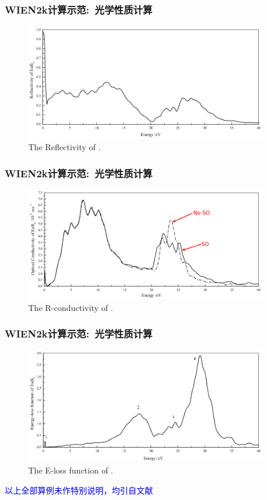 \documentclass[cjk,slidestop,compress,mathserif,blue]{beamer}
\begin{document}
\frame
{
	\frametitle{\textrm{WIEN2k}计算示范:~光学性质计算}
\vspace*{-5pt}
\begin{figure}[h!]
\centering
\includegraphics[width=4.15in]{Figures/WIEN2k_EuB6-Reflect.png}
\caption{\tiny \textrm{The Reflectivity of .}}%
\label{Fig:WIEN2k_EuB6-Reflectivity}
\end{figure}
}

\frame
{
	\frametitle{\textrm{WIEN2k}计算示范:~光学性质计算}
\vspace*{-5pt}
\begin{figure}[h!]
\centering
\includegraphics[width=4.15in]{Figures/WIEN2k_EuB6-Conduct.png}
\caption{\tiny \textrm{The R-conductivity of .}}%
\label{Fig:WIEN2k_EuB6-conductivity}
\end{figure}
}

\frame
{
	\frametitle{\textrm{WIEN2k}计算示范:~光学性质计算}
\vspace*{-5pt}
\begin{figure}[h!]
\centering
\includegraphics[width=4.15in]{Figures/WIEN2k_EuB6-eloss.png}
\caption{\tiny \textrm{The E-loss function of .}}%
\label{Fig:WIEN2k_EuB6-eloss}
\end{figure}
\vskip 5pt
\tiny{\textcolor{blue}{以上全部算例未作特别说明，均引自文献\cite{Jun_Jiang}}}
}
\end{document}
